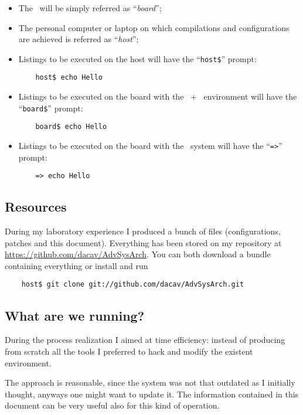     \begin{itemize}

    \item   The \MyBoard\ will be simply referred as
            ``\emph{board}'';

    \item   The personal computer or laptop on which compilations and
            configurations are achieved is referred as ``\emph{host}'';

    \item   Listings to be executed on the host will have the
            ``\lstinline{host$}'' prompt:
\begin{lstlisting}
    host$ echo Hello
\end{lstlisting}

    \item   Listings to be executed on the board with the
            \BusyBox\ + \Linux\ environment will have the
            ``\lstinline{board$}'' prompt:
\begin{lstlisting}
    board$ echo Hello
\end{lstlisting}

    \item   Listings to be executed on the board with the \uBoot\
            system will have the ``\lstinline{=>}'' prompt:
\begin{lstlisting}
    => echo Hello
\end{lstlisting}

    \end{itemize}

\newpage
\subsection{ Resources } \label{sub:Resources}

    During my laboratory experience I produced a bunch of files
    (configurations, patches and this document). Everything has been
    stored on my \TechName{Github} repository at
    \url{https://github.com/dacav/AdvSysArch}. You can both download a
    bundle containing everything or install \TechName{git} and run
\begin{lstlisting}
    host$ git clone git://github.com/dacav/AdvSysArch.git
\end{lstlisting}

\subsection{ What are we running? }

    During the process realization I aimed at time efficiency:
    instead of producing from scratch all the tools I preferred to
    hack and modify the existent environment.

    The approach is reasonable, since the system was not that
    outdated as I initially thought, anyways one might want to
    update it. The information contained in this document can be
    very useful also for this kind of operation.

